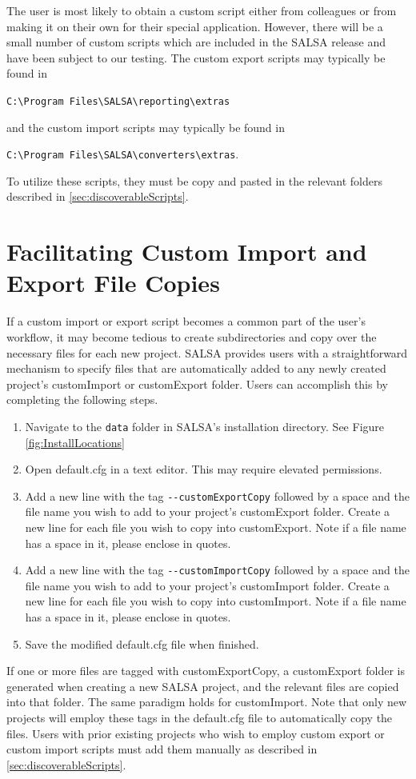 The user is most likely to obtain a custom script either from colleagues or from making it on their own for their special application.  However, there will be a small number of custom scripts which are included in the SALSA release and have been subject to our testing.  The custom export scripts may typically be found in\\
\begin{center}\verb+C:\Program Files\SALSA\reporting\extras+\end{center}
and the custom import scripts may typically be found in\\
\begin{center}\verb+C:\Program Files\SALSA\converters\extras+.\end{center}
To utilize these scripts, they must be copy and pasted in the relevant folders described in \ref{sec:discoverableScripts}.

\section{Facilitating Custom Import and Export File Copies}

If a custom import or export script becomes a common part of the user's workflow, it may become tedious to create subdirectories and copy over the necessary files for each new project. SALSA provides users with a straightforward mechanism to specify files that are automatically added to any newly created project's customImport or customExport folder. Users can accomplish this by completing the following steps.

\begin{enumerate}
	\item Navigate to the \verb+data+ folder in SALSA's installation directory. See Figure \ref{fig:InstallLocations}
	\item Open default.cfg in a text editor. This may require elevated permissions.
	\item Add a new line with the tag \verb+--customExportCopy+ followed by a space and the file name you wish to add to your project's customExport folder. Create a new line for each file you wish to copy into customExport. Note if a file name has a space in it, please enclose in quotes.
	\item Add a new line with the tag \verb+--customImportCopy+ followed by a space and the file name you wish to add to your project's customImport folder. Create a new line for each file you wish to copy into customImport. Note if a file name has a space in it, please enclose in quotes.
	\item Save the modified default.cfg file when finished.
\end{enumerate}

If one or more files are tagged with customExportCopy, a customExport folder is generated when creating a new SALSA project, and the relevant files are copied into that folder. The same paradigm holds for customImport. Note that only new projects will employ these tags in the default.cfg file to automatically copy the files. Users with prior existing projects who wish to employ custom export or custom import scripts must add them manually as described in \ref{sec:discoverableScripts}.
